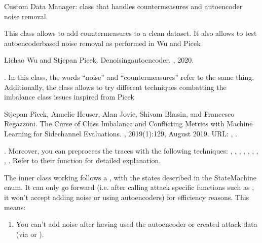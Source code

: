 \documentclass[letterpaper,10pt,english]{sphinxmanual}
\begin{document}
\begin{fulllineitems}
\sphinxAtStartPar
Custom Data Manager: class that handles countermeasures and autoencoder noise removal.

\sphinxAtStartPar
This class allows to add countermeasures to a clean dataset. It also allows to test
autoencoder\sphinxhyphen{}based noise removal as performed in Wu and Picek%
\begin{footnote}[1]\sphinxAtStartFootnote
Lichao Wu and Stjepan Picek. Denoising\sphinxhyphen{}autoencoder. , 2020.
%
\end{footnote}. In this class,
the words “noise” and “countermeasures” refer to the same thing. Additionally, the class
allows to try different techniques combatting the imbalance class issues inspired
from Picek %
\begin{footnote}[2]\sphinxAtStartFootnote
Stjepan Picek, Annelie Heuser, Alan Jovic, Shivam Bhasin, and Francesco Regazzoni. The Curse of Class Imbalance and Conflicting Metrics with Machine Learning for Side\sphinxhyphen{}channel Evaluations. , 2019(1):1\textendash{}29, August 2019. URL: , .
%
\end{footnote}. Moreover, you can pre\sphinxhyphen{}process the traces with the following
techniques: , , , , , , , , . Refer to
their function for detailed explanation.

\sphinxAtStartPar
The inner class working follows a , with the states described in the StateMachine enum. It can only
go forward (i.e. after calling attack specific functions such as , it won’t
accept adding noise or using autoencoders) for efficiency reasons. This means:
\begin{enumerate}
%
\item {} 
\sphinxAtStartPar
You can’t add noise after having used the autoencoder or created attack data (via  or ).


\end{enumerate}
\end{fulllineitems}
\end{document}
